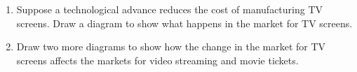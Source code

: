 \documentclass{article}
\begin{document}
\begin{enumerate}
\begin{enumerate}
\begin{itemize}
		\item video streaming and TV screens
		
		\item video streaming and movie tickets
		
		\item TV screens and movie tickets
		
		\end{itemize}
		
	\item Suppose a technological advance reduces the cost of manufacturing TV screens. Draw a diagram to show what happens in the market for TV screens.
	
	\item Draw two more diagrams to show how the change in the market for TV screens affects the markets for video streaming and movie tickets.
	
	\end{enumerate}

\end{enumerate}
\end{document}
